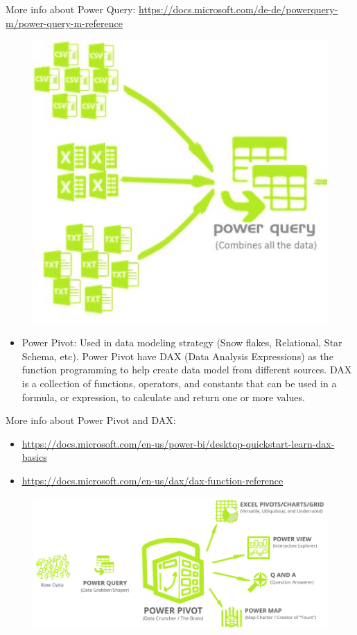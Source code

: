 \documentclass[]{book}
\providecommand{\tightlist}{%
  \setlength{\itemsep}{0pt}\setlength{\parskip}{0pt}}
\begin{document}
More info about Power Query:
\url{https://docs.microsoft.com/de-de/powerquery-m/power-query-m-reference}

\begin{figure}
\centering
\includegraphics{powerquery.JPG}
\caption{}
\end{figure}

\begin{itemize}
\tightlist
\item
  Power Pivot: Used in data modeling strategy (Snow flakes, Relational,
  Star Schema, etc). Power Pivot have DAX (Data Analysis Expressions) as
  the function programming to help create data model from different
  sources. DAX is a collection of functions, operators, and constants
  that can be used in a formula, or expression, to calculate and return
  one or more values.
\end{itemize}

More info about Power Pivot and DAX:

\begin{itemize}
\tightlist
\item
  \url{https://docs.microsoft.com/en-us/power-bi/desktop-quickstart-learn-dax-basics}
\item
  \url{https://docs.microsoft.com/en-us/dax/dax-function-reference}
\end{itemize}

\begin{figure}
\centering
\includegraphics{powerpivot.png}
\caption{}
\end{figure}
\end{document}
